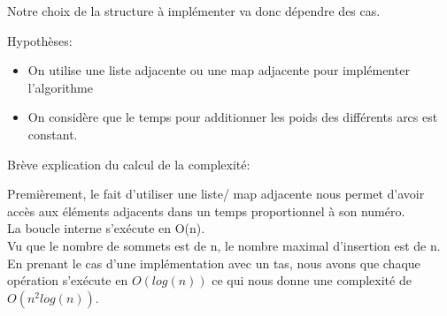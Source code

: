 \documentclass[a4paper]{article}
\begin{document}
Notre choix de la structure à implémenter va donc dépendre des cas.

Hypothèses:
\begin{itemize}
\item On utilise une liste adjacente ou une map adjacente pour implémenter l'algorithme
\item On considère que le temps pour additionner les poids des différents arcs est constant.
\end{itemize}

Brève explication du calcul de la complexité:

Premièrement, le fait d'utiliser une liste/ map adjacente nous permet d'avoir accès aux éléments adjacents dans un temps proportionnel à son numéro.\\
La boucle interne s'exécute en O(n).\\
Vu que le nombre de sommets est de n, le nombre maximal d'insertion est de n.\\
En prenant le cas d'une implémentation avec un tas, nous avons que chaque opération s'exécute en $O(log(n))$ ce qui nous donne une complexité de $O(n^2 log(n))$.
\end{document}
